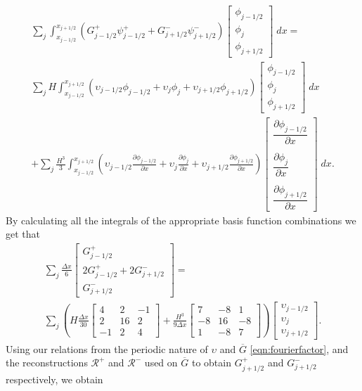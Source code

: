 \begin{multline*}
\sum_j \int_{x_{j-1/2}}^{x_{j + 1/2}} \left(G^+_{j-1/2}\psi^+_{j - 1/2} + G^-_{j+1/2}\psi^-_{j + 1/2}\right) \begin{bmatrix}
\phi_{j-1/2}\\\phi_j \\\phi_{j+1/2}
\end{bmatrix}  \; dx= \\   \sum_j H\int_{x_{j-1/2}}^{x_{j + 1/2}} \left(\upsilon_{j-1/2}\phi_{j - 1/2} + \upsilon_{j}\phi_{j}+ \upsilon_{j+1/2}\phi_{j + 1/2}\right) \begin{bmatrix}
\phi_{j-1/2}\\\phi_j \\\phi_{j+1/2}
\end{bmatrix}  \; dx \\ + 
\sum_j \frac{H^3}{3}\int_{x_{j-1/2}}^{x_{j + 1/2}} \left(\upsilon_{j-1/2} \frac{\partial \phi_{j - 1/2} }{\partial x} + \upsilon_{j}\frac{\partial \phi_{j} }{\partial x}+ \upsilon_{j+1/2}\frac{\partial \phi_{j + 1/2} }{\partial x}\right) \begin{bmatrix}
\dfrac{\partial \phi_{j - 1/2} }{\partial x}\\ \\\dfrac{\partial \phi_{j} }{\partial x}\\ \\\dfrac{\partial \phi_{j + 1/2} }{\partial x}   \end{bmatrix} \; dx.
\end{multline*}
By calculating all the integrals of the appropriate basis function combinations we get that 
\begin{multline*}
\sum_j \frac{\Delta x}{6}\begin{bmatrix} G^+_{j -1/2} \\2 G^+_{j -1/2}+2 G^-_{j +1/2} \\ G^-_{j +1/2} \end{bmatrix} = \\\sum_j \left(H\frac{\Delta x}{30}\begin{bmatrix} 4 &2 &-1 \\2 &16 &2  \\-1 &2 &4 \end{bmatrix} + \frac{H^3 }{9\Delta x}\begin{bmatrix} 7 &-8 &1  \\-8 &16 &-8  \\1 &-8 &7  \end{bmatrix} \right) \begin{bmatrix} \upsilon_{j -1/2} \\\upsilon_{j} \\ \upsilon_{j +1/2} \end{bmatrix}.
\end{multline*} 
Using our relations from the periodic nature of $\upsilon$ and $\overline{G}$ \eqref{eqn:fourierfactor}, and the reconstructions $\mathcal{R}^+$ and $\mathcal{R}^-$ used on $\overline{G}$ to obtain $G^+_{j +1/2}$ and $G^-_{j +1/2}$ respectively, we obtain

